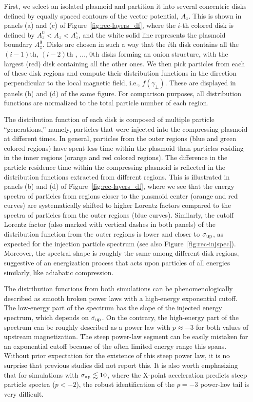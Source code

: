 First, we select an isolated plasmoid and partition it into several concentric disks defined by equally spaced contours of the vector potential, $A_z$. This is shown in panels (a) and (c) of Figure~\ref{fig:rec-layers_df}, where the $i$-th colored disk is defined by $A_z^0 < A_z < A_z^i$, and the white solid line represents the plasmoid boundary $A_z^0$. Disks are chosen in such a way that the $i$th disk contains all the $(i-1)$th, $(i-2)$th , ..., $0$th disks forming an onion structure, with the largest (red) disk containing all the other ones. We then pick particles from each of these disk regions and compute their distribution functions in the direction perpendicular to the local magnetic field, i.e., $f(\gamma_\perp)$. These are displayed in panels (b) and (d) of the same figure. For comparison purposes, all distribution functions are normalized to the total particle number of each region.

The distribution function of each disk is composed of multiple particle ``generations,'' namely, particles that were injected into the compressing plasmoid at different times. In general, particles from the outer regions (blue and green colored regions) have spent less time within the plasmoid than particles residing in the inner regions (orange and red colored regions). The difference in the particle residence time within the compressing plasmoid is reflected in the distribution functions extracted from different regions. This is illustrated in panels (b) and (d) of Figure~\ref{fig:rec-layers_df}, where we see that the energy spectra of particles from regions closer to the plasmoid center (orange and red curves) are systematically shifted to higher Lorentz factors compared to the spectra of particles from the outer regions (blue curves). Similarly, the cutoff Lorentz factor (also marked with vertical dashes in both panels) of the distribution function from the outer regions is lower and closer to $\sigma_{\rm up}$, as expected for the injection particle spectrum (see also Figure~\ref{fig:rec-injspec}). Moreover, the spectral shape is roughly the same among different disk regions, suggestive of an energization process that acts upon particles of all energies similarly, like adiabatic compression. 

The distribution functions from both simulations can be phenomenologically described as smooth broken power laws  with a high-energy exponential cutoff. The low-energy part of the spectrum has the slope of the injected energy spectrum, which depends on $\sigma_{\rm up}$. On the contrary, the high-energy part of the spectrum can be roughly described as a power law with $p\approx -3$ for both values of upstream magnetization. The steep power-law segment can be easily mistaken for an exponential cutoff because of the often limited energy range this spans. Without prior expectation for the existence of this steep power law, it is no surprise that previous studies did not report this. It is also worth emphasizing that for simulations with $\sigma_{\rm up} \lesssim 10$, where the X-point acceleration predicts steep particle spectra ($p<-2$), the robust identification of the $p=-3$ power-law tail is very difficult.

